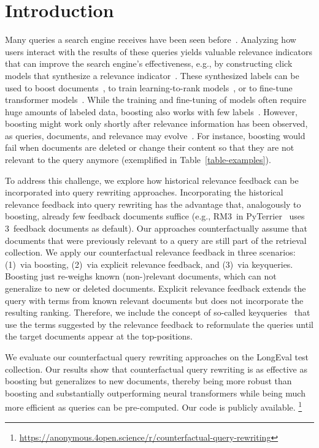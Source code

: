 \section{Introduction}


Many queries a search engine receives have been seen before~\cite{DBLP:journals/sigir/SilversteinHMM99}. Analyzing how users interact with the results of these queries yields valuable relevance indicators that can improve the search engine's effectiveness, e.g., by constructing click models that synthesize a relevance indicator~\cite{chuklin:2015}. These synthesized labels can be used to boost documents~\cite{keller:2024b}, to train learning-to-rank models~\cite{liu:2011}, or to fine-tune transformer models~\cite{lin:2021}. While the training and fine-tuning of models often require huge amounts of labeled data, boosting also works with few labels~\cite{keller:2024b}. However, boosting might work only shortly after relevance information has been observed, as queries, documents, and relevance may evolve~\cite{keller:2024}. For instance, boosting would fail when documents are deleted or change their content so that they are not relevant to the query anymore (exemplified in Table~\ref{table-examples}).




To address this challenge, we explore how historical relevance feedback can be incorporated into query rewriting approaches. Incorporating the historical relevance feedback into query rewriting has the advantage that, analogously to boosting, already few feedback documents suffice (e.g., RM3~in PyTerrier~\cite{macdonald:2020} uses 3~feedback documents as default). 
Our approaches counterfactually assume that documents that were previously relevant to a query are still part of the retrieval collection.
We apply our counterfactual relevance feedback in three scenarios: (1)~via boosting, (2)~via explicit relevance feedback, and (3)~via keyqueries. Boosting just 
re-weighs known (non-)relevant documents, which can not generalize to new or deleted documents. Explicit relevance feedback extends the query with terms from known relevant documents but does not incorporate the resulting ranking. Therefore, we include the concept of so-called keyqueries~\cite{gollub:2013a} that use the terms suggested by the relevance feedback to reformulate the queries until the target documents appear at the top-positions.

We evaluate our counterfactual query rewriting approaches on the LongEval test collection. Our results show that counterfactual query rewriting is as effective as boosting but generalizes to new documents, thereby being more robust than boosting and substantially outperforming neural transformers while being much more efficient as queries can be pre-computed. Our code is publicly available.%
\footnote{\url{https://anonymous.4open.science/r/counterfactual-query-rewriting}}



